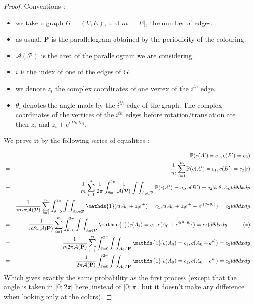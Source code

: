 \documentclass[a4paper,11pt]{article}
\theoremstyle{definition}
\theoremstyle{remark}
\begin{document}
\begin{proof}
Conventions : 
\begin{itemize}
\item we take a graph $G=(V,E)$, and $m = |E|$, the number of edges.

\item as usual, $\mathbf{P}$ is the parallelogram obtained by the periodicity of the colouring.

\item $\mathcal{A(P)}$ is the area of the parallelogram we are considering.

\item $i$ is the index of one of the edges of $G$.

\item we denote $z_i$ the complex coordinates of one vertex of the $i^{th}$ edge.

\item $\theta_i$ denotes the angle made by the $i^{th}$ edge of the graph. The complex coordinates of the vertices of the $i^{th}$ edges before rotation/translation are then $z_i $ and $z_i + e^{i.theta_i}$.

\end{itemize}

We prove it by the following series of equalities :

\begin{eqnarray*}
& & \mathbb{P}(c(A') = c_1, c(B') = c_2) \\
  &=& \frac{1}{m}\sum_{i=1}^{m} \mathbb{P}(c(A') = c_1, c(B') = c_2 | i)  \\
  &=& \frac{1}{m}\sum_{i=1}^{m}  \frac{1}{2\pi}\int_{\theta =0} ^{2\pi} \frac{1}{\mathcal{A(P)}}\int\int_{A_0 \in \mathbf{P}} \mathbb{P}(c(A') = c_1, c(B') = c_2 | i, \theta, A_0) d\theta dx dy \\  
  &=& \frac{1}{m 2\pi \mathcal{A(P)}}\sum_{i=1}^{m}\int_{\theta =0} ^{2\pi} \int\int_{A_0 \in \mathbf{P}} \mathds{1}(c(A_0 + z_i e^{i\theta}) = c_1, c(A_0 +z_i e^{i\theta} + e^{i (\theta + \theta_i)}) = c_2) d\theta dx dy \\  
    &=& \frac{1}{m 2\pi \mathcal{A}(\mathbf{P})}\sum_{i=1}^{m} \int_{\theta =0} ^{2\pi} \int\int_{A_0 \in \mathbf{P}} \mathds{1}(c(A_0) = c_1, c(A_0 + e^{i (\theta + \theta_i)}) = c_2 ) d\theta dx dy \hspace{1 cm} (*)\\ 
    &=& \frac{1}{m 2\pi \mathcal{A}(\mathbf{P})}\sum_{i=1}^{m} \int_{\theta =0} ^{2\pi} \int\int_{A_0 \in \mathbf{P}} \mathds{1}(c(A_0) = c_1, c(A_0 + e^{i \theta}) = c_2 ) d\theta dx dy \\ 
    &=& \frac{1}{2\pi \mathcal{A}(\mathbf{P})}\int_{\theta =0} ^{2\pi} \int\int_{A_0 \in \mathbf{P}} \mathds{1}(c(A_0) = c_1, c(A_0 + e^{i \theta}) = c_2 ) d\theta dx dy \\ 
\end{eqnarray*}
Which gives exactly the same probability as the first process (except that the angle is taken in $[0;2\pi[$ here, instead of $[0;\pi[$, but it doesn't make any difference when looking only at the colors).


\end{proof}
\end{document}
